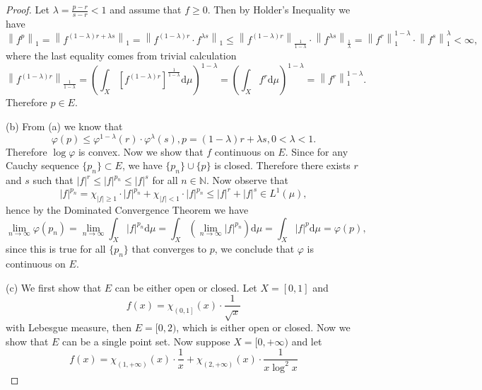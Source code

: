 \begin{proof}
Let $\lambda =\frac{p-r}{s-r}<1$ and assume that $f\ge 0$. Then by Holder's Inequality we have 
$$
\left\| f^p \right\| _1=\left\| f^{\left( 1-\lambda \right) r+\lambda s} \right\| _1=\left\| f^{\left( 1-\lambda \right) r}\cdot f^{\lambda s} \right\| _1\le \left\| f^{\left( 1-\lambda \right) r} \right\| _{\frac{1}{1-\lambda}}\cdot \left\| f^{\lambda s} \right\| _{\frac{1}{\lambda}}=\left\| f^r \right\| _{1}^{1-\lambda}\cdot \left\| f^s \right\| _{1}^{\lambda}<\infty ,
$$
where the last equality comes from trivial calculation 
$$
\left\| f^{\left( 1-\lambda \right) r} \right\| _{\frac{1}{1-\lambda}}=\left( \int_X{\left[ f^{\left( 1-\lambda \right) r} \right] ^{\frac{1}{1-\lambda}}\mathrm{d}\mu} \right) ^{1-\lambda}=\left( \int_X{f^r\mathrm{d}\mu} \right) ^{1-\lambda}=\left\| f^r \right\| _{1}^{1-\lambda}.
$$
Therefore $p\in E$.\par
(b) From (a) we know that 
$$
\varphi \left( p \right) \le \varphi ^{1-\lambda}\left( r \right) \cdot \varphi ^{\lambda}\left( s \right) ,p=\left( 1-\lambda \right) r+\lambda s,0<\lambda <1.
$$
Therefore $\log\varphi$ is convex. Now we show that $f$ continuous on $E$. Since for any Cauchy sequence $\{p_n\}\subset E$, we have $\{p_n\}\cup\{p\}$ is closed. Therefore there exists $r$ and $s$ such that $|f|^r\le|f|^{p_n}\le|f|^s$ for all $n\in\mathbb{N}$. Now observe that 
$$
\left| f \right|^{p_n}=\chi _{\left| f \right|\ge 1}\cdot \left| f \right|^{p_n}+\chi _{\left| f \right|<1}\cdot \left| f \right|^{p_n}\le \left| f \right|^r+\left| f \right|^s\in L^1\left( \mu \right) ,
$$
hence by the Dominated Convergence Theorem we have 
$$
\lim_{n\rightarrow \infty} \varphi \left( p_n \right) =\lim_{n\rightarrow \infty} \int_X{\left| f \right|^{p_n}\mathrm{d}\mu}=\int_X{\left( \lim_{n\rightarrow \infty} \left| f \right|^{p_n} \right) \mathrm{d}\mu}=\int_X{\left| f \right|^p\mathrm{d}\mu}=\varphi \left( p \right) ,
$$
since this is true for all $\{p_n\}$ that converges to $p$, we conclude that $\varphi$ is continuous on $E$.\par
(c) We first show that $E$ can be either open or closed. Let $X=[0,1]$ and 
$$
f\left( x \right) =\chi _{\left( 0,1 \right]}\left( x \right) \cdot \frac{1}{\sqrt{x}}
$$
with Lebesgue measure, then $E=[0,2)$, which is either open or closed. Now we show that $E$ can be a single point set. Now suppose $X=[0,+\infty)$ and let 
$$
f\left( x \right) =\chi _{\left( 1,+\infty \right)}\left( x \right) \cdot \frac{1}{x}+\chi _{\left( 2,+\infty \right)}\left( x \right) \cdot \frac{1}{x\log ^2x}
$$
\end{proof}
